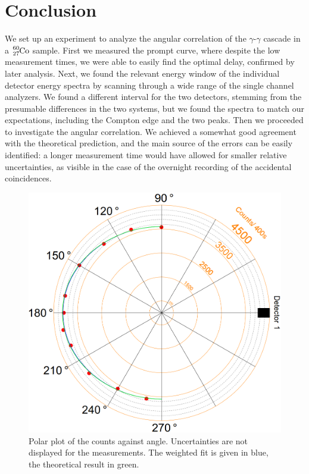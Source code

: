 \documentclass[twocolumn]{article}
\begin{document}
\section{Conclusion}
We set up an experiment to analyze the angular correlation of the $\gamma$-$\gamma$ cascade in a $\ce{_27^{60}Co}$ sample. First we measured the prompt curve, where despite the low measurement times, we were able to easily find the optimal delay, confirmed by later analysis. Next, we found the relevant energy window of the individual detector energy spectra by scanning through a wide range of the single channel analyzers. We found a different interval for the two detectors, stemming from the presumable differences in the two systems, but we found the spectra to match our expectations, including the Compton edge and the two peaks. Then we proceeded to investigate the angular correlation. We achieved a somewhat good agreement with the theoretical prediction, and the main source of the errors can be easily identified: a longer measurement time would have allowed for smaller relative uncertainties, as visible in the case of the overnight recording of the accidental coincidences.
\begin{figure}
	\centering
	\includegraphics[width=\linewidth]{polar2.png}
	\caption{Polar plot of the counts against angle. Uncertainties are not displayed for the measurements. The weighted fit is given in blue, the theoretical result in green.}
	\label{fig:polar}
\end{figure}
\end{document}
